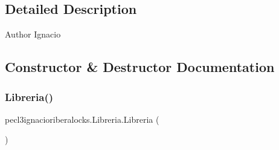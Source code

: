 \subsection{Detailed Description}
\begin{DoxyAuthor}{Author}
Ignacio 
\end{DoxyAuthor}


\subsection{Constructor \& Destructor Documentation}
\mbox{\label{classpecl3ignacioriberalocks_1_1_libreria_ade479befa1d595d3476eecaf77ef6330}} 
\subsubsection{\texorpdfstring{Libreria()}{Libreria()}}
{\footnotesize\ttfamily pecl3ignacioriberalocks.\+Libreria.\+Libreria (\begin{DoxyParamCaption}{ }\end{DoxyParamCaption})\hspace{0.3cm}{\ttfamily [inline]}}


